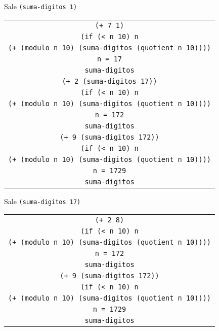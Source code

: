 \documentclass[letterpaper,11pt]{article}
\begin{document}
\begin{enumerate}
\begin{enumerate}
        \newpage
        Sale \texttt{(suma-digitos 1)}
        \begin{center}
            \begin{tabular}[h]{|c|}
                \hline
                \texttt{(+ 7 1)} \\
                \texttt{(if (< n 10) n} \\
                \texttt{(+ (modulo n 10) (suma-digitos (quotient n 10))))} \\ 
                \texttt{n = 17} \\
                \texttt{suma-digitos} \\
                \hline
                \hline
                \texttt{(+ 2 (suma-digitos 17))} \\
                \texttt{(if (< n 10) n} \\
                \texttt{(+ (modulo n 10) (suma-digitos (quotient n 10))))} \\ 
                \texttt{n = 172} \\
                \texttt{suma-digitos} \\
                \hline
                \hline
                \texttt{(+ 9 (suma-digitos 172))} \\
                \texttt{(if (< n 10) n} \\
                \texttt{(+ (modulo n 10) (suma-digitos (quotient n 10))))} \\ 
                \texttt{n = 1729} \\
                \texttt{suma-digitos} \\
                \hline
            \end{tabular}
        \end{center}

        Sale \texttt{(suma-digitos 17)}
        \begin{center}
            \begin{tabular}[h]{|c|}
                \hline
                \texttt{(+ 2 8)} \\
                \texttt{(if (< n 10) n} \\
                \texttt{(+ (modulo n 10) (suma-digitos (quotient n 10))))} \\ 
                \texttt{n = 172} \\
                \texttt{suma-digitos} \\
                \hline
                \hline
                \texttt{(+ 9 (suma-digitos 172))} \\
                \texttt{(if (< n 10) n} \\
                \texttt{(+ (modulo n 10) (suma-digitos (quotient n 10))))} \\ 
                \texttt{n = 1729} \\
                \texttt{suma-digitos} \\
                \hline
            \end{tabular}
        \end{center}


\end{enumerate}
\end{enumerate}
\end{document}

